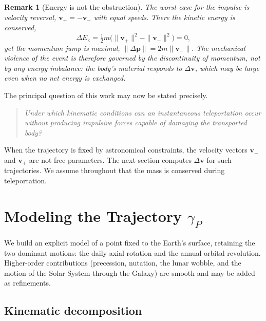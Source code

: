 \documentclass[11pt]{article}
\newtheorem{remark}[definition]{Remark}
\begin{document}
	\begin{remark}[Energy is not the obstruction]
		\label{rem:energy}
		The worst case for the impulse is velocity reversal,
		$\mathbf v_{+}=-\mathbf v_{-}$ with equal speeds. There the kinetic
		energy is \emph{conserved},
		\[
		\Delta E_{\mathrm k}
		=\tfrac12 m\bigl(\|\mathbf v_{+}\|^{2}-\|\mathbf v_{-}\|^{2}\bigr)=0,
		\]
		yet the momentum jump is maximal,
		$\|\Delta\mathbf p\|=2m\|\mathbf v_{-}\|$. The mechanical violence of
		the event is therefore governed by the discontinuity of
		\emph{momentum}, not by any energy imbalance: the body's material
		responds to $\Delta\mathbf v$, which may be large even when no net
		energy is exchanged.
	\end{remark}
	
	The principal question of this work may now be stated precisely.
	
	\begin{quote}
		\emph{Under which kinematic conditions can an instantaneous
			teleportation occur without producing impulsive forces capable of
			damaging the transported body?}
	\end{quote}
	
	When the trajectory is fixed by astronomical constraints, the velocity
	vectors $\mathbf v_{-}$ and $\mathbf v_{+}$ are not free parameters.
	The next section computes $\Delta\mathbf v$ for such trajectories. We
	assume throughout that the mass is conserved during teleportation.
	
	\section{Modeling the Trajectory $\gamma_P$}
	\label{sec:curve}
	
	We build an explicit model of a point fixed to the Earth's surface,
	retaining the two dominant motions: the daily axial rotation and the
	annual orbital revolution. Higher-order contributions (precession,
	nutation, the lunar wobble, and the motion of the Solar System through
	the Galaxy) are smooth and may be added as refinements.
	
	\subsection{Kinematic decomposition}
	
\end{document}
